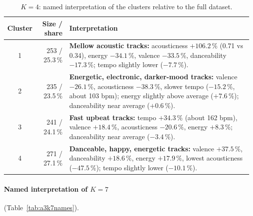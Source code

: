 \documentclass[11pt,letterpaper]{article}
\begin{document}
\begin{table}[H]
\centering
\caption{$K=4$: named interpretation of the clusters relative to the full
dataset.}
\label{tab:a3k4names}
\footnotesize
\begin{tabularx}{\textwidth}{@{}c r >{\raggedright\arraybackslash}X@{}}
\toprule
Cluster & Size / share & Interpretation \\
\midrule
1 & 253 / 25.3\,\% & \textbf{Mellow acoustic tracks:} acousticness
$+106.2\,\%$ (0.71 vs 0.34), energy $-34.1\,\%$, valence $-33.5\,\%$,
danceability $-17.3\,\%$; tempo slightly lower ($-7.7\,\%$). \\
2 & 235 / 23.5\,\% & \textbf{Energetic, electronic, darker-mood tracks:}
valence $-26.1\,\%$, acousticness $-38.3\,\%$, slower tempo ($-15.2\,\%$,
about 103 bpm); energy slightly above average ($+7.6\,\%$); danceability near
average ($+0.6\,\%$). \\
3 & 241 / 24.1\,\% & \textbf{Fast upbeat tracks:} tempo $+34.3\,\%$ (about
162 bpm), valence $+18.4\,\%$, acousticness $-20.6\,\%$, energy $+8.3\,\%$;
danceability near average ($-3.4\,\%$). \\
4 & 271 / 27.1\,\% & \textbf{Danceable, happy, energetic tracks:} valence
$+37.5\,\%$, danceability $+18.6\,\%$, energy $+17.9\,\%$, lowest
acousticness ($-47.5\,\%$); tempo slightly lower ($-10.1\,\%$). \\
\bottomrule
\end{tabularx}
\end{table}

\paragraph{Named interpretation of $K=7$}
(Table~\ref{tab:a3k7names}).
\end{document}
